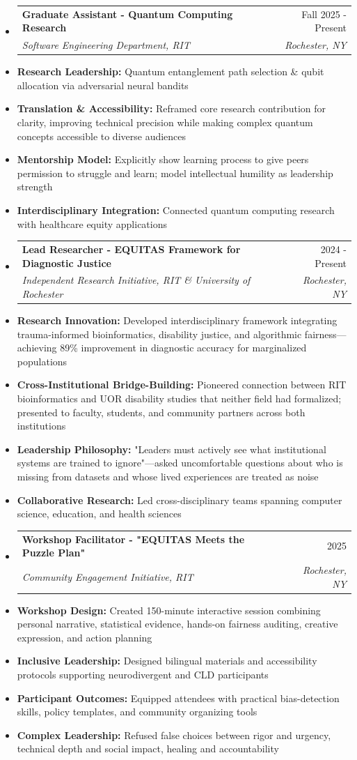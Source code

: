 \documentclass[10pt]{article}
\makeatletter
\newcommand{\resumeItem}[1]{\item\small{#1}}
\newcommand{\resumeSubheading}[4]{
  \vspace{-1pt}\item
    \begin{tabular*}{0.97\textwidth}[t]{l@{\extracolsep{\fill}}r}
      \textbf{#1} & #2 \\
      \textit{\small#3} & \textit{\small #4} \\
    \end{tabular*}\vspace{-5pt}
}
\makeatother
\begin{document}
\begin{itemize}[leftmargin=*]
\resumeSubheading
{Graduate Assistant - Quantum Computing Research}{Fall 2025 - Present}
{Software Engineering Department, RIT}{Rochester, NY}
\resumeItem{\textbf{Research Leadership:} Quantum entanglement path selection \& qubit allocation via adversarial neural bandits}
\resumeItem{\textbf{Translation \& Accessibility:} Reframed core research contribution for clarity, improving technical precision while making complex quantum concepts accessible to diverse audiences}
\resumeItem{\textbf{Mentorship Model:} Explicitly show learning process to give peers permission to struggle and learn; model intellectual humility as leadership strength}
\resumeItem{\textbf{Interdisciplinary Integration:} Connected quantum computing research with healthcare equity applications}

\resumeSubheading
{Lead Researcher - EQUITAS Framework for Diagnostic Justice}{2024 - Present}
{Independent Research Initiative, RIT \& University of Rochester}{Rochester, NY}
\resumeItem{\textbf{Research Innovation:} Developed interdisciplinary framework integrating trauma-informed bioinformatics, disability justice, and algorithmic fairness—achieving 89\% improvement in diagnostic accuracy for marginalized populations}
\resumeItem{\textbf{Cross-Institutional Bridge-Building:} Pioneered connection between RIT bioinformatics and UOR disability studies that neither field had formalized; presented to faculty, students, and community partners across both institutions}
\resumeItem{\textbf{Leadership Philosophy:} "Leaders must actively see what institutional systems are trained to ignore"—asked uncomfortable questions about who is missing from datasets and whose lived experiences are treated as noise}
\resumeItem{\textbf{Collaborative Research:} Led cross-disciplinary teams spanning computer science, education, and health sciences}

\resumeSubheading
{Workshop Facilitator - "EQUITAS Meets the Puzzle Plan"}{2025}
{Community Engagement Initiative, RIT}{Rochester, NY}
\resumeItem{\textbf{Workshop Design:} Created 150-minute interactive session combining personal narrative, statistical evidence, hands-on fairness auditing, creative expression, and action planning}
\resumeItem{\textbf{Inclusive Leadership:} Designed bilingual materials and accessibility protocols supporting neurodivergent and CLD participants}
\resumeItem{\textbf{Participant Outcomes:} Equipped attendees with practical bias-detection skills, policy templates, and community organizing tools}
\resumeItem{\textbf{Complex Leadership:} Refused false choices between rigor and urgency, technical depth and social impact, healing and accountability}


\end{itemize}
\end{document}
